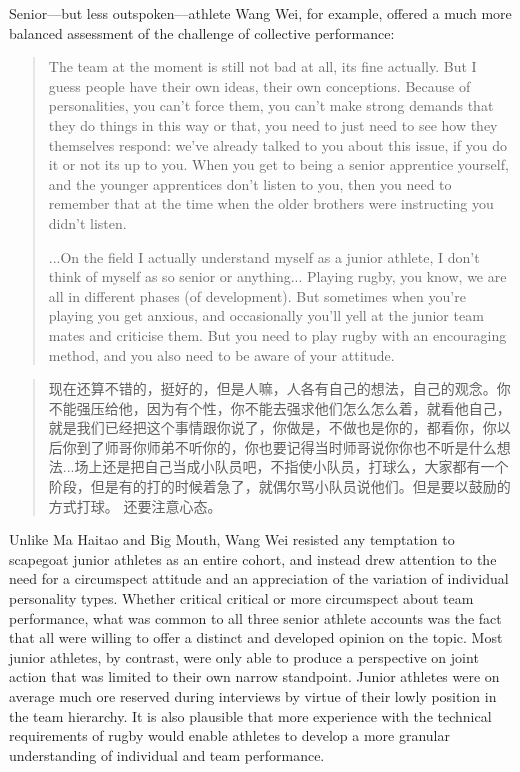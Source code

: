 \begin{CJK}{UTF8}{gbsn}
Senior---but less outspoken---athlete Wang Wei, for example, offered a much more balanced assessment of the challenge of collective performance:

\begin{quotation}
   The team at the moment is still not bad at all, its fine actually.  But I guess people have their own ideas, their own conceptions.  Because of personalities, you can't force them, you can't make strong demands that they do things in this way or that, you need to just need to see how they themselves respond: we've already talked to you about this issue, if you do it or not its up to you.   When you get to being a senior apprentice yourself, and the younger apprentices don't listen to you, then you need to remember that at the time when the older brothers were instructing you didn't listen.

   ...On the field I actually understand myself as a junior athlete,  I don't think of myself as so senior or anything... Playing rugby, you know,  we are all in different phases (of development).  But sometimes when you're playing you get anxious, and occasionally you'll yell at the junior team mates and criticise them.  But you need to play rugby with an encouraging method, and you also need to be aware of your attitude.
\end{quotation}

\begin{quotation}
  	现在还算不错的，挺好的，但是人嘛，人各有自己的想法，自己的观念。你不能强压给他，因为有个性，你不能去强求他们怎么怎么着，就看他自己，就是我们已经把这个事情跟你说了，你做是，不做也是你的，都看你，你以后你到了师哥你师弟不听你的，你也要记得当时师哥说你你也不听是什么想法...场上还是把自己当成小队员吧，不指使小队员，打球么，大家都有一个阶段，但是有的打的时候着急了，就偶尔骂小队员说他们。但是要以鼓励的方式打球。 还要注意心态。
\end{quotation}

Unlike Ma Haitao and Big Mouth, Wang Wei resisted any temptation to scapegoat junior athletes as an entire cohort, and instead drew attention to the need for a circumspect attitude and an appreciation of the variation of individual personality types.  Whether critical critical or more circumspect about team performance,
what was common to all three senior athlete accounts was the fact that all were willing to offer a distinct and developed opinion on the topic. Most junior athletes, by contrast, were only able to produce a perspective on joint action that was limited to their own narrow standpoint.  Junior athletes were on average much ore reserved during interviews by virtue of their lowly position in the team hierarchy.  It is also plausible that more experience with the technical requirements of rugby would enable athletes to develop a more granular understanding of individual and team performance.



\end{CJK}
